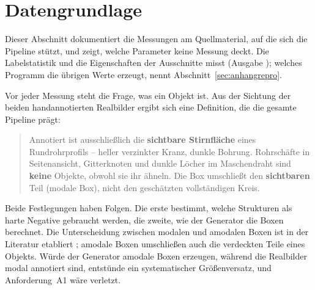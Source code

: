 %
%

\section{Datengrundlage}
\label{sec:daten}

Dieser Abschnitt dokumentiert die Messungen am Quellmaterial, auf die sich die
Pipeline stützt, und zeigt, welche Parameter keine Messung deckt. Die
Labelstatistik und die Eigenschaften der Ausschnitte misst
 (Ausgabe ); welches
Programm die übrigen Werte erzeugt, nennt Abschnitt~\ref{sec:anhangrepro}.

\label{sec:annotation} Vor jeder Messung steht die Frage, was ein Objekt ist. Aus der Sichtung der
beiden handannotierten Realbilder ergibt sich eine Definition, die die gesamte
Pipeline prägt:

\begin{quote}
Annotiert ist ausschließlich die \textbf{sichtbare Stirnfläche} eines
Rundrohrprofils -- heller verzinkter Kranz, dunkle Bohrung. Rohrschäfte in
Seitenansicht, Gitterknoten und dunkle Löcher im Maschendraht sind
\textbf{keine} Objekte, obwohl sie ihr ähneln. Die Box umschließt den
\textbf{sichtbaren} Teil (modale Box), nicht den geschätzten vollständigen Kreis.
\end{quote}

Beide Festlegungen haben Folgen. Die erste bestimmt, welche Strukturen als harte
Negative gebraucht werden, die zweite, wie der Generator die Boxen berechnet.
Die Unterscheidung zwischen modalen und amodalen Boxen ist in der Literatur
etabliert \parencite{li2016amodal,zhu2017amodal}; amodale Boxen umschließen
auch die verdeckten Teile eines Objekts. Würde der Generator amodale Boxen
erzeugen, während die Realbilder modal annotiert sind, entstünde ein
systematischer Größenversatz, und Anforderung~A1 wäre verletzt.

